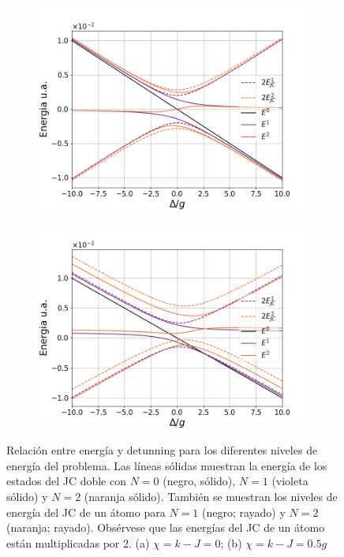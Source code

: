 \begin{figure}
    \centering
    \begin{subfigure}[h]{0.49\textwidth}
        \centering
        \includegraphics[width=\textwidth]{figuras/ch4/energias 0.png}
        \caption{}
        \label{fig:relación energia detunning 1}
    \end{subfigure}
    \hfill
    \begin{subfigure}[h]{0.49\textwidth}
        \centering
        \includegraphics[width=\textwidth]{figuras/ch4/energias 0.5.png}
        \caption{}
        \label{fig:relación energia detunning 2}
    \end{subfigure}
       \caption{Relación entre energía y detunning para los diferentes niveles de energía del problema. Las líneas sólidas muestran la energía de los estados del JC doble con $N=0$ (negro, sólido), $N=1$ (violeta sólido) y $N=2$ (naranja sólido). También se muestran los niveles de energía del JC de un átomo para $N=1$ (negro; rayado) y $N=2$ (naranja; rayado). Obsérvese que las energías del JC de un átomo están multiplicadas por 2. (a) $\chi=k-J=0$; (b) $\chi=k-J=0.5g$}
       \label{fig:relación energia detunning}
\end{figure}
